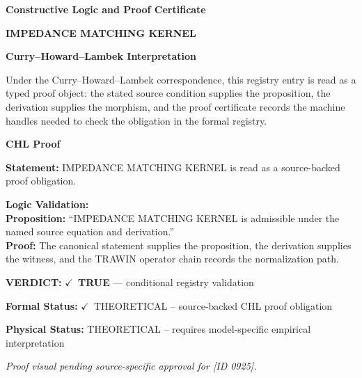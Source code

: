 \clearpage
\begingroup\tzpsupportsetup
\noindent\textbf{\fontsize{10.8pt}{12.8pt}\selectfont [ID 0925] Constructive Logic and Proof Certificate}\par
\noindent\textbf{\fontsize{10pt}{12pt}\selectfont IMPEDANCE MATCHING KERNEL}\par
\vspace{0.45em}
\begingroup
\footnotesize
\setlength{\parskip}{0.22em}
\setlength{\parindent}{0pt}
\noindent\textbf{Curry--Howard--Lambek Interpretation}\par
Under the Curry--Howard--Lambek correspondence, this registry entry is read as a typed proof
object: the stated source condition supplies the proposition, the derivation supplies the
morphism, and the proof certificate records the machine handles needed to check the obligation
in the formal registry.

\vspace{0.45em}
\noindent\textbf{CHL Proof}\par
\textbf{Statement:} IMPEDANCE MATCHING KERNEL is read as a source-backed proof obligation.

\textbf{Logic Validation:}\\
\textbf{Proposition:} ``IMPEDANCE MATCHING KERNEL is admissible under the named source equation and derivation.''\\
\textbf{Proof:} The canonical statement supplies the proposition, the derivation supplies the witness, and the TRAWIN operator chain records the normalization path.

\textbf{VERDICT:} \ensuremath{\checkmark}\ \textbf{TRUE} --- conditional registry validation

\textbf{Formal Status:} \ensuremath{\checkmark}\ THEORETICAL -- source-backed CHL proof obligation

\textbf{Physical Status:} THEORETICAL -- requires model-specific empirical interpretation
\par\vspace{0.45em}
\par
\vfill
\begingroup\footnotesize\itshape
Proof visual pending source-specific approval for [ID 0925].
\par\endgroup
\vfill
\endgroup
\endgroup
